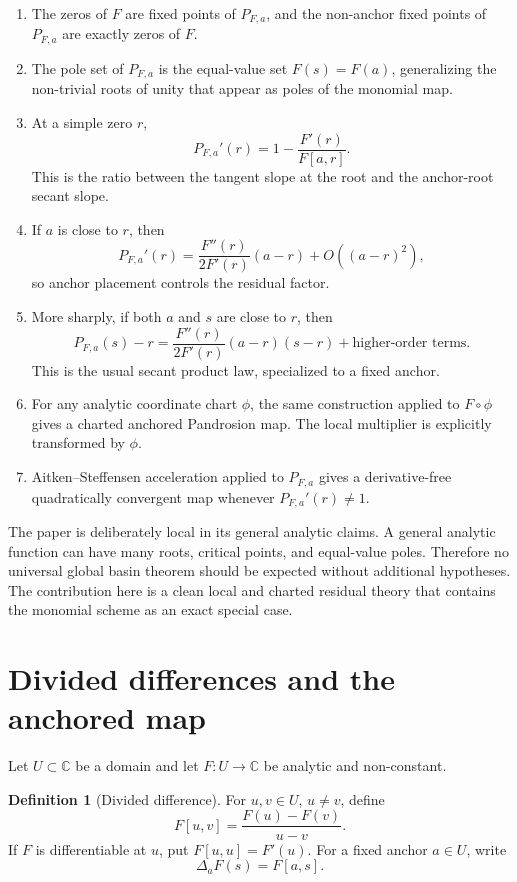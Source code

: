 \documentclass[11pt]{article}
\theoremstyle{definition}
\newtheorem{definition}[theorem]{Definition}
\newcommand{\C}{\mathbb{C}}
\begin{document}
\begin{enumerate}[label=\textup{(\roman*)},leftmargin=*]
\item The zeros of $F$ are fixed points of $P_{F,a}$, and the non-anchor fixed points of $P_{F,a}$ are exactly zeros of $F$.
\item The pole set of $P_{F,a}$ is the equal-value set $F(s)=F(a)$, generalizing the non-trivial roots of unity that appear as poles of the monomial map.
\item At a simple zero $r$,
\[
        P_{F,a}'(r)=1-\frac{F'(r)}{F[a,r]}.
\]
This is the ratio between the tangent slope at the root and the anchor-root secant slope.
\item If $a$ is close to $r$, then
\[
        P_{F,a}'(r)=\frac{F''(r)}{2F'(r)}(a-r)+O((a-r)^2),
\]
so anchor placement controls the residual factor.
\item More sharply, if both $a$ and $s$ are close to $r$, then
\[
        P_{F,a}(s)-r=\frac{F''(r)}{2F'(r)}(a-r)(s-r)+\text{higher-order terms}.
\]
This is the usual secant product law, specialized to a fixed anchor.
\item For any analytic coordinate chart $\phi$, the same construction applied to $F\circ\phi$ gives a charted anchored Pandrosion map.  The local multiplier is explicitly transformed by $\phi$.
\item Aitken--Steffensen acceleration applied to $P_{F,a}$ gives a derivative-free quadratically convergent map whenever $P_{F,a}'(r)\ne1$.
\end{enumerate}

The paper is deliberately local in its general analytic claims.  A general analytic function can have many roots, critical points, and equal-value poles.  Therefore no universal global basin theorem should be expected without additional hypotheses.  The contribution here is a clean local and charted residual theory that contains the monomial scheme as an exact special case.

\section{Divided differences and the anchored map}

Let $U\subset\C$ be a domain and let $F:U\to\C$ be analytic and non-constant.

\begin{definition}[Divided difference]
For $u,v\in U$, $u\ne v$, define
\[
        F[u,v]=\frac{F(u)-F(v)}{u-v}.
\]
If $F$ is differentiable at $u$, put $F[u,u]=F'(u)$.
For a fixed anchor $a\in U$, write
\[
        \Delta_aF(s)=F[a,s].
\]
\end{definition}
\end{document}
